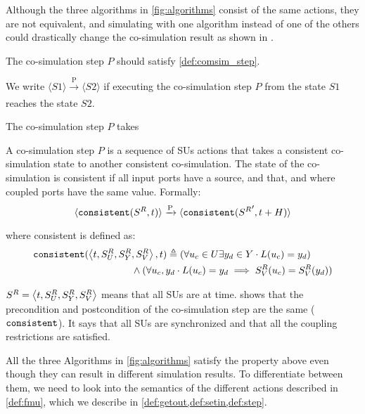 Although the three algorithms in \cref{fig:algorithms} consist of the same actions, they are not equivalent, and simulating with one algorithm instead of one of the others could drastically change the co-simulation result as shown in \cite{Gomes2019c,hansen_verification_2021}. 

The co-simulation step $P$ should satisfy \cref{def:comsim_step}.

We write $\langle S1 \rangle \xrightarrow[\text{}]{\text{P}} \langle S2 \rangle$ if executing the co-simulation step $P$ from the state $S1$ reaches the state $S2$.

The co-simulation step $P$ takes 

\begin{definition}\label{def:comsim_step}
  A co-simulation step $P$ is a sequence of SUs actions that takes a consistent co-simulation state to another consistent  co-simulation. 
  The state of the co-simulation is consistent if all input ports have a source, and that, and where coupled ports have the same value.
  Formally:
  \begin{align}
    \langle \mathtt{consistent}(S^{R}_{}, t) \rangle 
    \xrightarrow[\text{}]{\text{P}} \langle \mathtt{consistent}({S^{R}_{}}', t+H) \rangle
  \end{align}
  where consistent is defined as:
  \begin{align*}
    &\mathtt{consistent}( \left\langle t,S^{R}_{U}, S^{R}_{Y},S^{R}_{V} \right\rangle , t) \triangleq 
    (\forall u_{c} \in U
    \exists y_{d} \in Y 
    \cdot L(u_{c}) = y_{d})  \nonumber \\
    &\qquad \qquad \qquad \qquad \qquad \land
    (\forall u_{c}, y_{d} \cdot L(u_{c}) = y_{d} 
    \implies
    S^{R}_{V}(u_{c}) = S^{R}_{V}(y_{d}))
  \end{align*}
\end{definition}

$S^{R}_{} =  \left\langle t, S^{R}_{U}, S^{R}_{Y}, S^{R}_{V} \right\rangle $ means that all SUs are at time.
 shows that the precondition and postcondition of the co-simulation step are the same ($\mathtt{consistent}$).
It says that all SUs are synchronized and that all the coupling restrictions are satisfied.

All the three Algorithms in \cref{fig:algorithms} satisfy the property above even though they can result in different simulation results.
To differentiate between them, we need to look into the semantics of the different actions described in \cref{def:fmu}, which we describe in \cref{def:getout,def:setin,def:step}.

